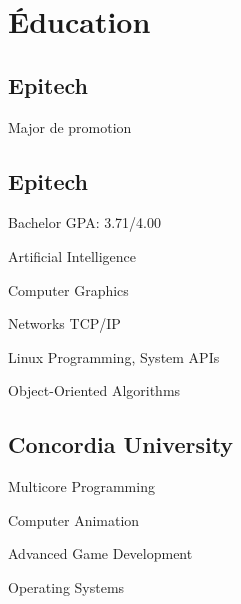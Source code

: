 \documentclass[
  french,
  a4paper
]{resume-openfont}
\begin{document}
\noindent%
\begin{minipage}[t]{0.31\textwidth}



\section{Éducation}

\subsection{Epitech}
\subtitle{Master en Informatique}
Major de promotion
\sectionsep

\subsection{Epitech}
\subtitle{Bachelor en Informatique}
Bachelor GPA: 3.71/4.00
\vspace{0.8\topsep} %
\begin{coursework}
\item Artificial Intelligence
\item Computer Graphics
\item Networks TCP/IP
\item Linux Programming, System APIs
\item Object-Oriented Algorithms
\end{coursework}
\sectionsep

\subsection{Concordia University}
\subtitle{Étudiant international en informatique, niveau master}
\begin{coursework}
\item Multicore Programming
\item Computer Animation
\item Advanced Game Development
\item Operating Systems
\end{coursework}



\end{minipage}
\end{document}
